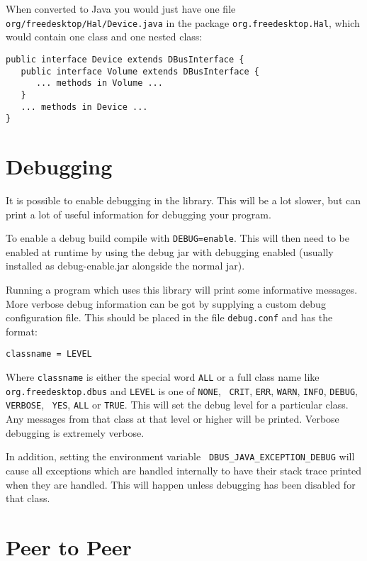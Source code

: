 \documentclass[a4paper,12pt]{article}
\begin{document}
When converted to Java you would just have one file {\tt
org/freedesktop/Hal/Device.java} in the package {\tt org.freedesktop.Hal},
which would contain one class and one nested class:

\begin{verbatim}
public interface Device extends DBusInterface {
   public interface Volume extends DBusInterface {
      ... methods in Volume ...
   }
   ... methods in Device ...
}
\end{verbatim}

\section{Debugging}

It is possible to enable debugging in the library. This will be a lot slower,
but can print a lot of useful information for debugging your program.

To enable a debug build compile with {\tt DEBUG=enable}. This will then need to be
enabled at runtime by using the debug jar with debugging enabled (usually
installed as debug-enable.jar alongside the normal jar).

Running a program which uses this library will print some informative messages.
More verbose debug information can be got by supplying a custom debug
configuration file. This should be placed in the file {\tt debug.conf} and has the
format:

\begin{verbatim}
classname = LEVEL
\end{verbatim}

Where {\tt classname} is either the special word {\tt ALL} or a full class name
like {\tt org.freedesktop.dbus} and {\tt LEVEL} is one of {\tt NONE}, {\tt
CRIT}, {\tt ERR}, {\tt WARN}, {\tt INFO}, {\tt DEBUG}, {\tt VERBOSE}, {\tt
YES}, {\tt ALL} or {\tt TRUE}. This will set the debug level for a particular
class. Any messages from that class at that level or higher will be printed.
Verbose debugging is extremely verbose.

In addition, setting the environment variable {\tt
DBUS\_JAVA\_EXCEPTION\_DEBUG} will cause all exceptions which are handled
internally to have their stack trace printed when they are handled. This will
happen unless debugging has been disabled for that class.

\section{Peer to Peer}
\end{document}
